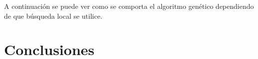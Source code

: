 A continuación se puede ver como se comporta el algoritmo genético dependiendo de que búsqueda local se utilice.

\newpage

\section*{Conclusiones}
\lipsum[1]

\newpage

\printbibliography
\thispagestyle{bibfooter}








